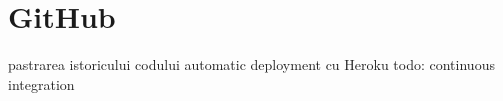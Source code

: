 \section{GitHub}
	pastrarea istoricului codului
	automatic deployment cu Heroku
	todo: continuous integration
